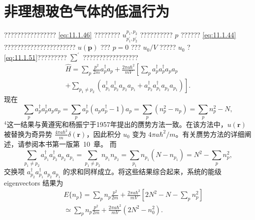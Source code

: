 \section{非理想玻色气体的低温行为}\label{ux975eux7406ux60f3ux73bbux8272ux6c14ux4f53ux7684ux4f4eux6e29ux884cux4e3a}
???????????????? \autoref{eq:11.1.46} ???????? \(u_{p_{1}^{\prime},p_{2}^{\prime}}^{p_{1},p_{2}}\) ?????????? \(p\) ?????? \autoref{eq:11.1.44} ?????????????????????? \(u(\mathbf{p})\) ??? \(p=0\) ??? \(u_{0}/V\) ????? \(u_{0}\) ? \autoref{eq:11.1.51}????????? \(\sum^{\prime}\) ?????????????????
\begin{equation}\tag{11.2.1}\label{eq:11.2.1}
\begin{array}{r} { \hat { H } = \sum _ { p } \frac { p ^{2} } { 2 m } a _ { p } ^{\dagger} a _ { p } + \frac { 2 \pi a \hbar ^{2} } { m V } \left[ \sum _ { p } a _ { p } ^{\dagger} a _ { p } ^{\dagger} a _ { p } a _ { p } \right. } \\{ \left. + \sum _ { p _ { 1 } \neq p _ { 2 } } \left( a _ { p _ { 1 } } ^{\dagger} a _ { p _ { 2 } } ^{\dagger} a _ { p _ { 2 } } a _ { p _ { 1 } } + a _ { p _ { 2 } } ^{\dagger} a _ { p _ { 1 } } ^{\dagger} a _ { p _ { 2 } } a _ { p _ { 1 } } \right) \right] . } \end{array}
\end{equation}
现在
\begin{equation}\tag{11.2.2}\label{eq:11.2.2}
\sum _ { p } a _ { p } ^{\dagger} a _ { p } ^{\dagger} a _ { p } a _ { p } = \sum _ { p } a _ { p } ^{\dagger} ( a _ { p } a _ { p } ^{\dagger} - 1 ) a _ { p } = \sum _ { p } ( n _ { p } ^{2} - n _ { p } ) = \sum _ { p } n _ { p } ^{2} - N ,
\end{equation}
\(^{4}\)这一结果与黄遵宪和杨振宁于1957年提出的赝势方法一致。在该方法中，\(u(\boldsymbol{r})\) 被替换为奇异势 \(\frac{4\pi a\hbar^{2}}{m}\delta(\boldsymbol{r})\)，因此积分 \(u_{0}\) 变为 \(4\pi a\hbar^{2}/m\)。有关赝势方法的详细阐述，请参阅本书第一版第~10~章。
而
\begin{equation}\tag{11.2.3}\label{eq:11.2.3}
\sum _ { p _ { 1 } \neq p _ { 2 } } a _ { p _ { 1 } } ^{\dagger} a _ { p _ { 2 } } ^{\dagger} a _ { p _ { 2 } } a _ { p _ { 1 } } = \sum _ { p _ { 1 } \neq p _ { 2 } } n _ { p _ { 1 } } n _ { p _ { 2 } } = \sum _ { p _ { 1 } } n _ { p _ { 1 } } ( N - n _ { p _ { 1 } } ) = N ^{2} - \sum _ { p } n _ { p } ^{2} ,
\end{equation}
交换项 \(a_{p_{2}}^{\dagger}a_{p_{1}}^{\dagger}a_{p_{2}}a_{p_{1}}\) 的求和同样成立。将这些结果综合起来，系统的能级 eigenvectors 结果为
\begin{equation}\tag{11.2.4}\label{eq:11.2.4}
\begin{array}{rlr} & { } & { E \{ n _ { p } \} = \sum _ { p } n _ { p } \frac { p ^{2} } { 2 m } + \frac { 2 \pi a \hbar ^{2} } { m V } \left[ 2 N ^{2} - N - \sum _ { p } n _ { p } ^{2} \right] } \\& { } & { \simeq \sum _ { p } n _ { p } \frac { p ^{2} } { 2 m } + \frac { 2 \pi a \hbar ^{2} } { m V } ( 2 N ^{2} - n _ { 0 } ^{2} ) . } \end{array}
\end{equation}
